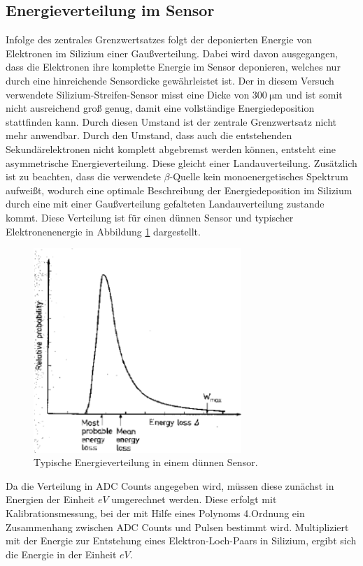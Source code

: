 \subsection{Energieverteilung im Sensor}
Infolge des zentrales Grenzwertsatzes folgt der deponierten Energie von Elektronen im Silizium einer Gaußverteilung. Dabei wird davon ausgegangen, dass die Elektronen ihre komplette Energie im Sensor deponieren, welches nur durch eine hinreichende Sensordicke gewährleistet ist. Der in diesem Versuch verwendete Silizium-Streifen-Sensor misst eine Dicke von $\SI{300}{\micro\meter}$ und ist somit nicht ausreichend groß genug, damit eine vollständige Energiedeposition stattfinden kann. Durch diesen Umstand ist der zentrale Grenzwertsatz nicht mehr anwendbar. Durch den Umstand, dass auch die entstehenden Sekundärelektronen nicht komplett abgebremst werden können, entsteht eine asymmetrische Energieverteilung. Diese gleicht einer Landauverteilung. Zusätzlich ist zu beachten, dass die verwendete $\beta$-Quelle kein monoenergetisches Spektrum aufweißt, wodurch eine optimale Beschreibung der Energiedeposition im Silizium durch eine mit einer Gaußverteilung gefalteten Landauverteilung zustande kommt. Diese Verteilung ist für einen dünnen Sensor und typischer Elektronenenergie in Abbildung \ref{Verteilung} dargestellt.

\begin{figure}[H]
  \centering
  \includegraphics[width=0.7\textwidth]{ressources/Verteilung.png}
  \caption{Typische Energieverteilung in einem dünnen Sensor.}
  \label{Verteilung}
\end{figure}


Da die Verteilung in ADC Counts angegeben wird, müssen diese zunächst in Energien der Einheit $eV$ umgerechnet werden. Diese erfolgt mit Kalibrationsmessung, bei der mit Hilfe eines Polynoms 4.Ordnung ein Zusammenhang zwischen ADC Counts und Pulsen bestimmt wird. Multipliziert mit der Energie zur Entstehung eines Elektron-Loch-Paars in Silizium, ergibt sich die Energie in der Einheit $eV$. 



